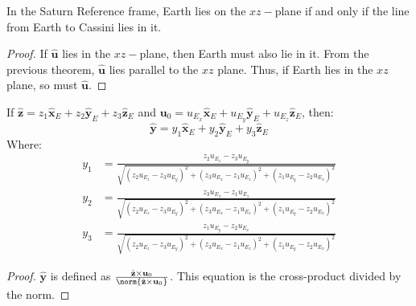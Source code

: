 \documentclass[crop=false,class=article,oneside]{standalone}
\begin{document}
        \begin{theorem}
            In the Saturn Reference frame,
            Earth lies on the $xz-$plane if and
            only if the line from
            Earth to Cassini lies in it.
        \end{theorem}
        \begin{proof}
            If $\hat{\mathbf{u}}$ lies in the $xz-$plane,
            then Earth must also lie in it.
            From the previous theorem,
            $\hat{\mathbf{u}}$ lies parallel
            to the $xz$ plane. Thus, if Earth lies
            in the $xz$ plane, so must $\hat{\mathbf{u}}$.
        \end{proof}
        \begin{theorem}
            If
            $\hat{\mathbf{z}}%
             =z_{1}\hat{\mathbf{x}}_{E}+%
              z_{2}\hat{\mathbf{y}}_{E}+%
              z_3\hat{\mathbf{z}}_{E}$
            and
            $\mathbf{u}_{0}%
             =u_{E_{x}}\hat{\mathbf{x}}_{E}+%
              u_{E_{y}}\hat{\mathbf{y}}_{E}+%
              u_{E_{z}}\hat{\mathbf{z}}_{E}$,
            then:
            \begin{equation*}
                \hat{\mathbf{y}}
                =y_{1}\hat{\mathbf{x}}_{E}+
                 y_{2}\hat{\mathbf{y}}_{E}+
                 y_{3}\hat{\mathbf{z}}_{E}
            \end{equation*}
            Where:
            \begin{align*}
                y_1
                &=\frac{z_2u_{E_{z}}-z_{3}u_{E_{y}}}
                       {\sqrt{(z_2u_{E_{z}}-z_3u_{E_{y}})^2+%
                        (z_3u_{E_{x}}-z_1u_{E_{z}})^2+%
                        (z_1u_{E_{y}}-z_2u_{E_{x}})^2}}\\
                y_{2}&=
                    \frac{z_3u_{E_{x}}- z_{1}u_{E_{z}}}%
                         {\sqrt{(z_2u_{E_{z}}-z_3u_{E_{y}})^2+%
                          (z_3u_{E_{x}}-z_1u_{E_{z}})^2+%
                          (z_1u_{E_{y}}-z_2u_{E_{x}})^2}}\\
                y_{3}&=
                    \frac{z_1u_{E_{y}}-z_2u_{E_{x}}}
                         {\sqrt{(z_2u_{E_{z}}-z_3u_{E_{y}})^2+%
                          (z_3u_{E_{x}}-z_1u_{E_{z}})^2+%
                          (z_1u_{E_{y}}-z_2u_{E_{x}})^2}}
            \end{align*}
        \end{theorem}
        \begin{proof}
            $\hat{\mathbf{y}}$ is defined as
            $\frac{\hat{\mathbf{z}}\times\mathbf{u}_{0}}%
                  {\norm{\hat{\mathbf{z}}\times\mathbf{u}_{0}}}$.
            This equation is the
            cross-product divided by the norm.
        \end{proof}
\end{document}
